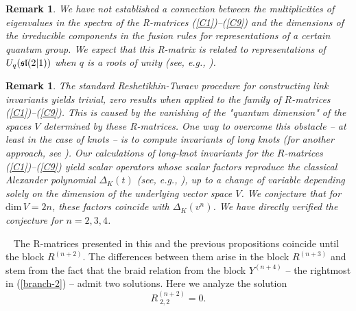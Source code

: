 \documentclass[11pt]{article}
\newcounter{theorem}\def\thetheorem{\thesection.\arabic{theorem}}\makeatletter
\newtheorem{rem}[theorem]{Remark}
\begin{document}
\begin{rem}{\rm
We have not established a connection between the multiplicities of eigenvalues in
the spectra of the R-matrices (\ref{C1})–(\ref{C9}) and the dimensions of the irreducible components in the fusion rules for representations  of a certain quantum group. We expect  that this R-matrix is related to representations of
$U_q(\frak{sl}(2|1))$ when $q$ is a roots of unity (see, e.g., \cite{AAB}).
		}
\end{rem}

\begin{rem}{\rm
		The standard Reshetikhin-Turaev procedure for constructing link invariants yields trivial, zero results when applied to 
		the family of $R$-matrices (\ref{C1})–(\ref{C9}).
		This is caused by the vanishing of the "quantum dimension" of the spaces $V$ determined by these R-matrices. One way to overcome this obstacle -- at least in the case of knots -- is to compute invariants of long knots \cite{K2} (for another approach, see \cite{GPT}).
		Our calculations of long-knot invariants for the $R$-matrices (\ref{C1})–(\ref{C9}) yield scalar operators whose scalar factors reproduce the classical Alexander polynomial $\Delta_K(t)$ (see, e.g., \cite{L}), up to a change of variable depending solely on the dimension of the underlying vector space $V$. We conjecture that for $\mbox{dim}\, V = 2n$, these factors coincide with $\Delta_K(v^n)$. We have directly verified the conjecture for $n=2, 3, 4$.}
\end{rem}


~
The R-matrices presented in this and the previous propositions coincide until the block $R^{(n+2)}$.
The differences between them arise in the block $R^{(n+3)}$ and stem from the fact that the braid relation from the block $Y^{(n+4)}$ -- the rightmost in (\ref{branch-2}) --  admit two solutions.
Here we analyze the solution
$$
R^{(n+2)}_{\;2,2} =0.
$$
\end{document}
